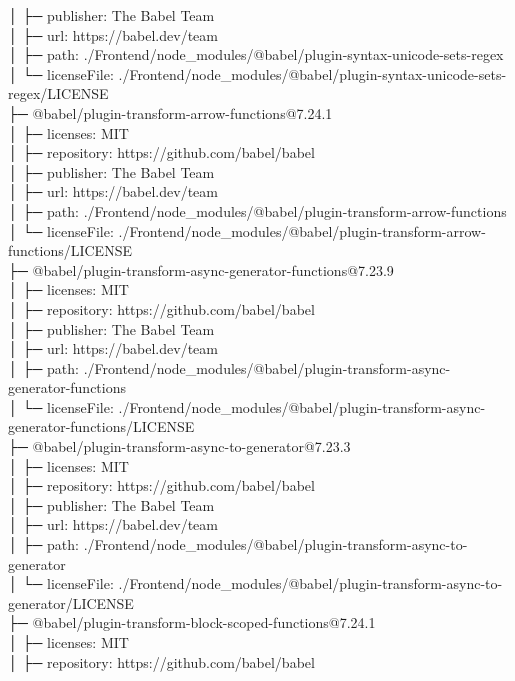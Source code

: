 │  ├─ publisher: The Babel Team\\
│  ├─ url: https://babel.dev/team\\
│  ├─ path: ./Frontend/node\_modules/@babel/plugin-syntax-unicode-sets-regex\\
│  └─ licenseFile: ./Frontend/node\_modules/@babel/plugin-syntax-unicode-sets-regex/LICENSE\\
├─ @babel/plugin-transform-arrow-functions@7.24.1\\
│  ├─ licenses: MIT\\
│  ├─ repository: https://github.com/babel/babel\\
│  ├─ publisher: The Babel Team\\
│  ├─ url: https://babel.dev/team\\
│  ├─ path: ./Frontend/node\_modules/@babel/plugin-transform-arrow-functions\\
│  └─ licenseFile: ./Frontend/node\_modules/@babel/plugin-transform-arrow-functions/LICENSE\\
├─ @babel/plugin-transform-async-generator-functions@7.23.9\\
│  ├─ licenses: MIT\\
│  ├─ repository: https://github.com/babel/babel\\
│  ├─ publisher: The Babel Team\\
│  ├─ url: https://babel.dev/team\\
│  ├─ path: ./Frontend/node\_modules/@babel/plugin-transform-async-generator-functions\\
│  └─ licenseFile: ./Frontend/node\_modules/@babel/plugin-transform-async-generator-functions/LICENSE\\
├─ @babel/plugin-transform-async-to-generator@7.23.3\\
│  ├─ licenses: MIT\\
│  ├─ repository: https://github.com/babel/babel\\
│  ├─ publisher: The Babel Team\\
│  ├─ url: https://babel.dev/team\\
│  ├─ path: ./Frontend/node\_modules/@babel/plugin-transform-async-to-generator\\
│  └─ licenseFile: ./Frontend/node\_modules/@babel/plugin-transform-async-to-generator/LICENSE\\
├─ @babel/plugin-transform-block-scoped-functions@7.24.1\\
│  ├─ licenses: MIT\\
│  ├─ repository: https://github.com/babel/babel\\
